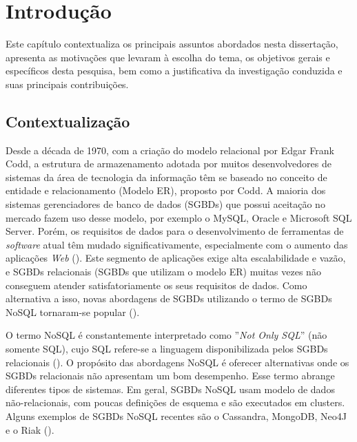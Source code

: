 
\chapter{Introdução}
\label{chp:introduction}


\noindent Este capítulo contextualiza os principais assuntos abordados nesta dissertação, apresenta as motivações que levaram à escolha do tema, os objetivos gerais e específicos desta pesquisa, bem como a justificativa da investigação conduzida e suas principais contribuições.
\clearpage


\section{Contextualização}

Desde a década de 1970, com a criação do modelo relacional por Edgar Frank Codd, a estrutura de armazenamento adotada por muitos desenvolvedores de sistemas da área de tecnologia da informação têm se baseado no conceito de entidade e relacionamento (Modelo ER), proposto por Codd. A maioria dos sistemas gerenciadores de banco de dados (SGBDs) que possui aceitação no mercado fazem uso desse modelo, por exemplo o MySQL, Oracle e Microsoft SQL Server. Porém, os requisitos de dados para o desenvolvimento de ferramentas de \textit{software} atual têm mudado significativamente, especialmente com o aumento das aplicações \textit{Web} (\cite{nasholm:2012}). Este segmento de aplicações exige alta escalabilidade e vazão, e SGBDs relacionais (SGBDs que utilizam o modelo ER) muitas vezes não conseguem atender satisfatoriamente os seus requisitos de dados. Como alternativa a isso, novas abordagens de SGBDs utilizando o termo de SGBDs NoSQL tornaram-se popular (\cite{silva:2016}).

O termo NoSQL é constantemente interpretado como ''\emph{Not Only SQL}'' (não somente SQL), cujo SQL refere-se a linguagem disponibilizada pelos SGBDs relacionais (\cite{nasholm:2012}). O propósito das abordagens NoSQL é oferecer alternativas onde os SGBDs relacionais não apresentam um bom desempenho. Esse termo abrange diferentes tipos de sistemas. Em geral, SGBDs NoSQL usam modelo de dados não-relacionais, com poucas definições de esquema e são executados em clusters. Alguns exemplos de SGBDs NoSQL recentes são o Cassandra, MongoDB, Neo4J e o Riak (\cite{fowler:2013}).

